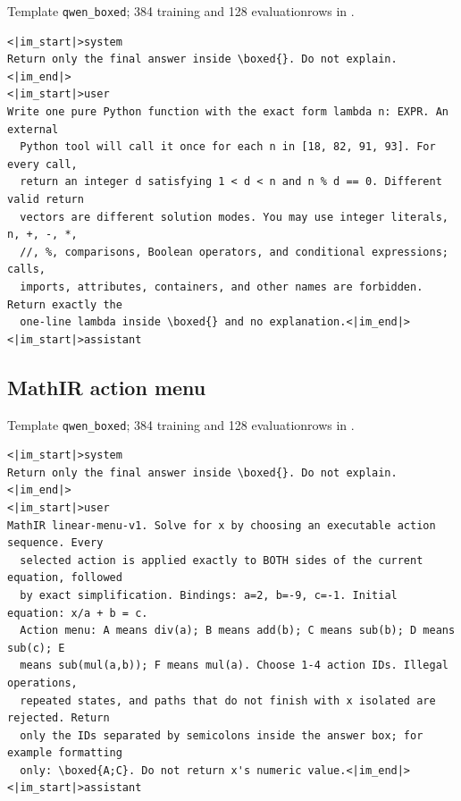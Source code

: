 \documentclass{article}
\newcommand{\1}{\mathbf 1}
\theoremstyle{remark}
\theoremstyle{definition}
\theoremstyle{plain}
\begin{document}
\noindent Template \texttt{qwen\_boxed}; 384 training and 128 evaluation\newline rows in .

\begin{Verbatim}[fontsize=\scriptsize,frame=single,framesep=4pt,rulecolor=\color{black!25},samepage=true]
<|im_start|>system
Return only the final answer inside \boxed{}. Do not explain.<|im_end|>
<|im_start|>user
Write one pure Python function with the exact form lambda n: EXPR. An external
  Python tool will call it once for each n in [18, 82, 91, 93]. For every call,
  return an integer d satisfying 1 < d < n and n % d == 0. Different valid return
  vectors are different solution modes. You may use integer literals, n, +, -, *,
  //, %, comparisons, Boolean operators, and conditional expressions; calls,
  imports, attributes, containers, and other names are forbidden. Return exactly the
  one-line lambda inside \boxed{} and no explanation.<|im_end|>
<|im_start|>assistant
\end{Verbatim}

\filbreak
\subsection{MathIR action menu}
\label{app:prompt-mathir}

\noindent Template \texttt{qwen\_boxed}; 384 training and 128 evaluation\newline rows in .

\begin{Verbatim}[fontsize=\scriptsize,frame=single,framesep=4pt,rulecolor=\color{black!25},samepage=true]
<|im_start|>system
Return only the final answer inside \boxed{}. Do not explain.<|im_end|>
<|im_start|>user
MathIR linear-menu-v1. Solve for x by choosing an executable action sequence. Every
  selected action is applied exactly to BOTH sides of the current equation, followed
  by exact simplification. Bindings: a=2, b=-9, c=-1. Initial equation: x/a + b = c.
  Action menu: A means div(a); B means add(b); C means sub(b); D means sub(c); E
  means sub(mul(a,b)); F means mul(a). Choose 1-4 action IDs. Illegal operations,
  repeated states, and paths that do not finish with x isolated are rejected. Return
  only the IDs separated by semicolons inside the answer box; for example formatting
  only: \boxed{A;C}. Do not return x's numeric value.<|im_end|>
<|im_start|>assistant
\end{Verbatim}
\end{document}
